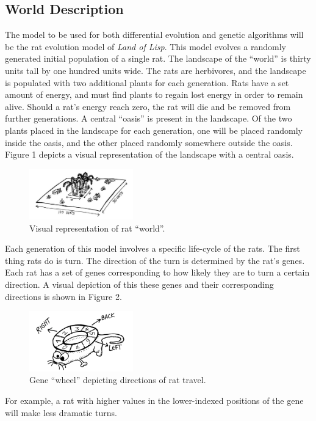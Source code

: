\documentclass{sig-alternate}
\begin{document}
\subsection{World Description}
The model to be used for both differential evolution and genetic algorithms will be the rat evolution model of \emph{Land of Lisp}.  This model evolves a randomly generated initial population of a single rat.  The landscape of the ``world'' is thirty units tall by one hundred units wide.  The rats are herbivores, and the landscape is populated with two additional plants for each generation.  Rats have a set amount of energy, and must find plants to regain lost energy in order to remain alive.  Should a rat's energy reach zero, the rat will die and be removed from further generations.  A central ``oasis'' is present in the landscape.  Of the two plants placed in the landscape for each generation, one will be placed randomly inside the oasis, and the other placed randomly somewhere outside the oasis.  Figure 1 depicts a visual representation of the landscape with a central oasis. \cite{LOL}
\begin{figure}
\centering
\includegraphics[width=0.4\textwidth]{landscape.PNG}
\caption{Visual representation of rat ``world''.}
\end{figure}

Each generation of this model involves a specific life-cycle of the rats.  The first thing rats do is turn.  The direction of the turn is determined by the rat's genes.  Each rat has a set of genes corresponding to how likely they are to turn a certain direction.  A visual depiction of this these genes and their corresponding directions is shown in Figure 2.  \cite{LOL}
\begin{figure}
\centering
\includegraphics[width=0.4\textwidth]{rat_wheel.PNG}
\caption{Gene ``wheel'' depicting directions of rat travel.}
\end{figure}
For example, a rat with higher values in the lower-indexed positions of the gene will make less dramatic turns.  
\end{document}
